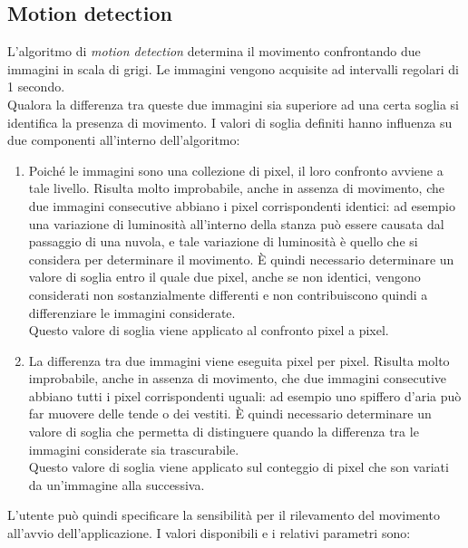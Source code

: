 \subsection{Motion detection}
L'algoritmo di \textit{motion detection} determina il movimento confrontando due immagini in scala di grigi. Le immagini vengono acquisite ad intervalli regolari di 1 secondo.\\
Qualora la differenza tra queste due immagini sia superiore ad una certa soglia si identifica la presenza di movimento. I valori di soglia definiti hanno influenza su due componenti all'interno dell'algoritmo:
\begin{enumerate}
  \item Poiché le immagini sono una collezione di pixel, il loro confronto avviene a tale livello. Risulta molto improbabile, anche in assenza di movimento, che due immagini consecutive abbiano i pixel corrispondenti identici: ad esempio una variazione di luminosità all'interno della stanza può essere causata dal passaggio di una nuvola, e tale variazione di luminosità è quello che si considera per determinare il movimento. \`E quindi necessario determinare un valore di soglia entro il quale due pixel, anche se non identici, vengono considerati non sostanzialmente differenti e non contribuiscono quindi a differenziare le immagini considerate.\\
  Questo valore di soglia viene applicato al confronto pixel a pixel.
  \item La differenza tra due immagini viene eseguita pixel per pixel. Risulta molto improbabile, anche in assenza di movimento, che due immagini consecutive abbiano tutti i pixel corrispondenti uguali: ad esempio uno spiffero d'aria può far muovere delle tende o dei vestiti. \`E quindi necessario determinare un valore di soglia che permetta di distinguere quando la differenza tra le immagini considerate sia trascurabile.\\
  Questo valore di soglia viene applicato sul conteggio di pixel che son variati da un'immagine alla successiva.
\end{enumerate}
L'utente può quindi specificare la sensibilità per il rilevamento del movimento all'avvio dell'applicazione. I valori disponibili e i relativi parametri sono:
